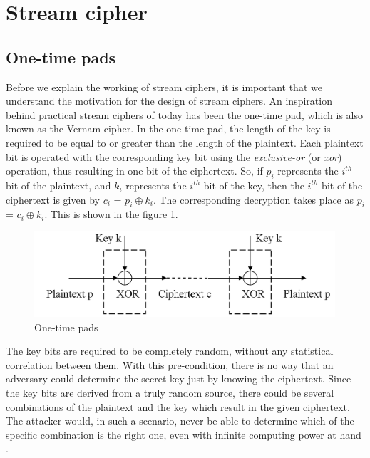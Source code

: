 \section{Stream cipher}
\label{sec:stream-cipher}

\subsection{One-time pads} 
\label{sec:one-time-pads}

Before we explain the working of stream ciphers, it is important that we understand the motivation for the design of stream ciphers. An inspiration behind practical stream ciphers of today has been the one-time pad, which is also known as the Vernam cipher. In the one-time pad, the length of the key is required to be equal to or greater than the length of the plaintext. Each plaintext bit is operated with the corresponding key bit using the \emph{exclusive-or} (or \emph{xor}) operation, thus resulting in one bit of the ciphertext. So, if $p_i$ represents the $i^{th}$ bit of the plaintext, and $k_i$ represents the $i^{th}$ bit of the key, then the $i^{th}$ bit of the ciphertext is given by $c_i$ = $p_i \oplus k_i$. The corresponding decryption takes place as $p_i$ = $c_i \oplus k_i$. This is shown in the figure \ref{fig:one-time-pad}.

\begin{figure}[ht!]
	\centering
		\includegraphics[width=4.4in]{./figures/one-time-pad.PNG}
	\caption{One-time pads}	
	\label{fig:one-time-pad}
\end{figure}

The key bits are required to be completely random, without any statistical correlation between them. With this pre-condition, there is no way that an adversary could determine the secret key just by knowing the ciphertext. Since the key bits are derived from a truly random source, there could be several combinations of the plaintext and the key which result in the given ciphertext. The attacker would, in such a scenario, never be able to determine which of the specific combination is the right one, even with infinite computing power at hand \cite{one-time-pads-link}.


